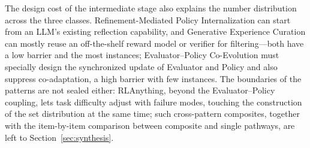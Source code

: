 The design cost of the intermediate stage also explains the number distribution across the three classes. Refinement-Mediated Policy Internalization can start from an LLM's existing reflection capability, and Generative Experience Curation can mostly reuse an off-the-shelf reward model or verifier for filtering---both have a low barrier and the most instances; Evaluator--Policy Co-Evolution must specially design the synchronized update of Evaluator and Policy and also suppress co-adaptation, a high barrier with few instances. The boundaries of the patterns are not sealed either: RLAnything, beyond the Evaluator--Policy coupling, lets task difficulty adjust with failure modes, touching the construction of the set distribution at the same time; such cross-pattern composites, together with the item-by-item comparison between composite and single pathways, are left to Section~\ref{sec:synthesis}.

